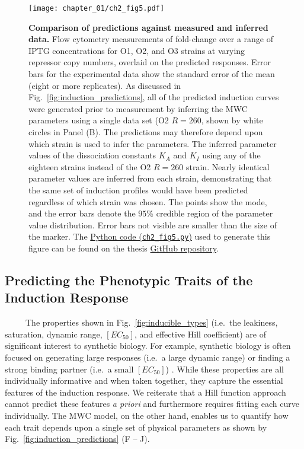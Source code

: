 \documentclass[12pt]{caltech_thesis}
\begin{document}
\hypertarget{fig:induction_experiments}{%
\begin{figure}
\centering
\texttt{[image: chapter\_01/ch2\_fig5.pdf]}
\caption[{Comparison of predictions against measured and inferred
data.}]{\textbf{Comparison of predictions against measured and inferred
data.} Flow cytometry measurements of fold-change over a range of IPTG
concentrations for O1, O2, and O3 strains at varying repressor copy
numbers, overlaid on the predicted responses. Error bars for the
experimental data show the standard error of the mean (eight or more
replicates). As discussed in Fig.~\ref{fig:induction_predictions}, all
of the predicted induction curves were generated prior to measurement by
inferring the MWC parameters using a single data set (O2 \(R=260\),
shown by white circles in Panel (B). The predictions may therefore
depend upon which strain is used to infer the parameters. The inferred
parameter values of the dissociation constants \(K_A\) and \(K_I\) using
any of the eighteen strains instead of the O2 \(R=260\) strain. Nearly
identical parameter values are inferred from each strain, demonstrating
that the same set of induction profiles would have been predicted
regardless of which strain was chosen. The points show the mode, and the
error bars denote the \(95\)\% credible region of the parameter value
distribution. Error bars not visible are smaller than the size of the
marker. The
\href{https://github.com/gchure/phd/blob/master/src/chapter_02/code/ch2_fig5.py}{Python
code (\texttt{ch2\_fig5.py})} used to generate this figure can be found
on the thesis \href{https://github.com/gchure/phd}{GitHub repository}.}
\label{fig:induction_experiments}
\end{figure}
}

\hypertarget{predicting-the-phenotypic-traits-of-the-induction-response}{%
\subsection{Predicting the Phenotypic Traits of the Induction
Response}\label{predicting-the-phenotypic-traits-of-the-induction-response}}

~~~~~The properties shown in Fig.~\ref{fig:inducible_types} (i.e.~the
leakiness, saturation, dynamic range, \([EC_{50}]\), and effective Hill
coefficient) are of significant interest to synthetic biology. For
example, synthetic biology is often focused on generating large
responses (i.e.~a large dynamic range) or finding a strong binding
partner (i.e.~a small \([EC_{50}]\)) \autocite{brophy2014,shis2014}.
While these properties are all individually informative and when taken
together, they capture the essential features of the induction response.
We reiterate that a Hill function approach cannot predict these features
\emph{a priori} and furthermore requires fitting each curve
individually. The MWC model, on the other hand, enables us to quantify
how each trait depends upon a single set of physical parameters as shown
by Fig.~\ref{fig:induction_predictions} (F -- J).
\end{document}
